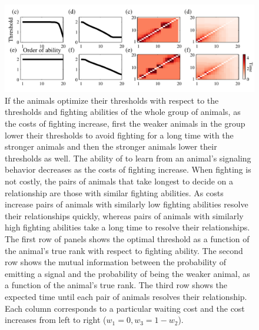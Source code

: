 \documentclass{article}
\begin{document}
\begin{figure}
\includegraphics[width=\textwidth]{groupeq_thresholds.pdf}
\caption{\label{groupeq_thresholds} If the animals optimize their thresholds with respect to the thresholds and fighting abilities of the whole group of animals, as the costs of fighting increase, first the weaker animals in the group lower their thresholds to avoid fighting for a long time with the stronger animals and then the stronger animals lower their thresholds as well.  The ability of to learn from an animal's signaling behavior decreases as the costs of fighting increase. When fighting is not costly, the pairs of animals that take longest to decide on a relationship are those with similar fighting abilities. As costs increase pairs of animals with similarly low fighting abilities resolve their relationships quickly, whereas pairs of animals with similarly high fighting abilities take a long time to resolve their relationships.  The first row of panels shows the optimal threshold as a function of the animal's true rank with respect to fighting ability.  The second row shows the mutual information between the probability of emitting a signal and the probability of being the weaker animal, as a function of the animal's true rank.  The third row shows the expected time until each pair of animals resolves their relationship.  Each column corresponds to a particular waiting cost and the cost increases from left to right ($w_1=0, w_3=1-w_2$).   }
\end{figure}
\end{document}
